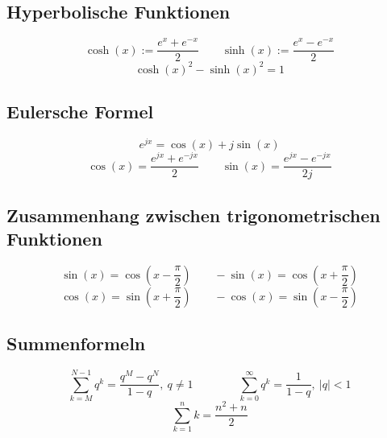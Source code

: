 \documentclass[10pt,a4paper]{article}
\begin{document}
\subsection*{Hyperbolische Funktionen}
\[ \cosh(x) := \frac{e^x + e^{-x}}{2} \qquad \sinh(x) := \frac{e^x - e^{-x}}{2} \]
\[ \cosh(x)^2 - \sinh(x)^2 = 1 \]

\subsection*{Eulersche Formel}
\[ e^{jx} = \cos(x) + j\sin(x) \]
\[ \cos(x) = \frac{e^{jx}+e^{-jx}}{2} \qquad \sin(x) = \frac{e^{jx} - e^{-jx}}{2j} \]

\subsection*{Zusammenhang zwischen trigonometrischen Funktionen}
\[ \sin(x) = \cos\left(x - \frac{\pi}{2}\right) \qquad -\sin(x) = \cos\left(x + \frac{\pi}{2}\right) \]
\[ \cos(x) = \sin\left(x + \frac{\pi}{2}\right) \qquad -\cos(x) = \sin\left(x - \frac{\pi}{2}\right) \]

\subsection*{Summenformeln}
\[ \sum_{k = M}^{N - 1} q^k = \frac{q^M - q^N}{1 - q}, ~ q \neq 1  \qquad \qquad \sum_{k = 0}^{\infty} q^k = \frac{1}{1 - q}, ~ |q| < 1 \]
\[ \sum_{k = 1}^{n} k = \frac{n^2 + n}{2} \]
\end{document}
